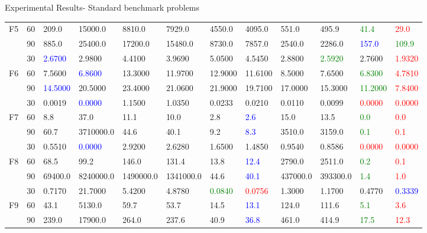 \documentclass [9pt,times] {beamer}
\begin{document}
\begin{frame}[plain]{Experimental Results- Standard benchmark problems}
\begin{center}
\begin{tabular}{p{0.08in} | p{0.09in} | p{0.25in} |  p{0.23in} |  p{0.25in}|  p{0.25in} |  p{0.25in} | p{0.25in} |  p{0.25in} | p{0.25in} |  p{0.25in} |  p{0.25in}}
F5	&	60	&	209.0	&	15000.0	&	8810.0	&	7929.0	&	4550.0	&	4095.0	&	551.0	&	495.9	&\textcolor{green}{	41.4	}&\textcolor{red}{	29.0	}\\
	&	90	&	885.0	&	25400.0	&	17200.0	&	15480.0	&	8730.0	&	7857.0	&	2540.0	&	2286.0	&\textcolor{blue}{	157.0	}&\textcolor{green}{	109.9	}\\
\hline																							
	&	30	&\textcolor{blue}{	2.6700	}&	2.9800	&	4.4100	&	3.9690	&	5.0500	&	4.5450	&	2.8800	&\textcolor{green}{	2.5920	}&	2.7600	&\textcolor{red}{	1.9320	}\\
F6	&	60	&	7.5600	&\textcolor{blue}{	6.8600	}&	13.3000	&	11.9700	&	12.9000	&	11.6100	&	8.5000	&	7.6500	&\textcolor{green}{	6.8300	}&\textcolor{red}{	4.7810	}\\
	&	90	&\textcolor{blue}{	14.5000	}&	20.5000	&	23.4000	&	21.0600	&	21.9000	&	19.7100	&	17.0000	&	15.3000	&\textcolor{green}{	11.2000	}&\textcolor{red}{	7.8400	}\\
\hline																							
	&	30	&	0.0019	&\textcolor{blue}{	0.0000	}&	1.1500	&	1.0350	&	0.0233	&	0.0210	&	0.0110	&	0.0099	&\textcolor{red}{	0.0000	}&\textcolor{red}{	0.0000	}\\
F7	&	60	&	8.8	&	37.0	&	11.1	&	10.0	&	2.8	&\textcolor{blue}{	2.6	}&	15.0	&	13.5	&\textcolor{green}{	0.0	}&\textcolor{red}{	0.0	}\\
	&	90	&	60.7	&	3710000.0	&	44.6	&	40.1	&	9.2	&\textcolor{blue}{	8.3	}&	3510.0	&	3159.0	&\textcolor{green}{	0.1	}&\textcolor{red}{	0.1	}\\
\hline																							
	&	30	&	0.5510	&\textcolor{blue}{	0.0000	}&	2.9200	&	2.6280	&	1.6500	&	1.4850	&	0.9540	&	0.8586	&\textcolor{red}{	0.0000	}&\textcolor{red}{	0.0000	}\\
F8	&	60	&	68.5	&	99.2	&	146.0	&	131.4	&	13.8	&\textcolor{blue}{	12.4	}&	2790.0	&	2511.0	&\textcolor{green}{	0.2	}&\textcolor{red}{	0.1	}\\
	&	90	&	69400.0	&	8240000.0	&	1490000.0	&	1341000.0	&	44.6	&\textcolor{blue}{	40.1	}&	437000.0	&	393300.0	&\textcolor{green}{	1.4	}&\textcolor{red}{	1.0	}\\
\hline																							
	&	30	&	0.7170	&	21.7000	&	5.4200	&	4.8780	&\textcolor{green}{	0.0840	}&\textcolor{red}{	0.0756	}&	1.3000	&	1.1700	&	0.4770	&\textcolor{blue}{	0.3339	}\\
F9	&	60	&	43.1	&	5130.0	&	59.7	&	53.7	&	14.5	&\textcolor{blue}{	13.1	}&	124.0	&	111.6	&\textcolor{green}{	5.1	}&\textcolor{red}{	3.6	}\\
	&	90	&	239.0	&	17900.0	&	264.0	&	237.6	&	40.9	&\textcolor{blue}{	36.8	}&	461.0	&	414.9	&\textcolor{green}{	17.5	}&\textcolor{red}{	12.3	}\\

\end{tabular}
\end{center}
\end{frame}
\end{document}
